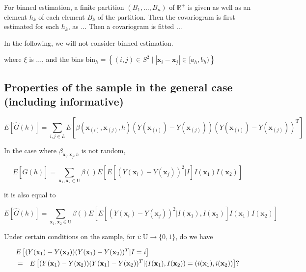\documentclass[12pt]{article}
\theoremstyle{definition}
\theoremstyle{remark}
\newcommand{\paramnuisance}{\xi}
\newcommand{\Sample}{S}
\newcommand{\Pop}{\mathrm{U}}
\newcommand{\position}{\mathbf{x}}
\newcommand{\Sampleindex}{L}
\newcommand{\Signal}{Y}
\begin{document}
For binned estimation, a finite partition $(B_1,\ldots,B_n)$ of $\mathbb{R}^+$ is given as well as an element $h_k$ of each element $B_k$ of the partition. 
Then the covariogram is first estimated for each $h_k$, as 
...
Then a covariogram is fitted 
...

In the following, we will not consider binned estimation.


where {\color{red} $\paramnuisance$ is ..., and the bins $\mathrm{bin}_h=\left\{(i,j)\in\Sample^2\mid \left|\position_i-\position_j\right|\in [a_h,b_h)\right\}$}

\subsection{Properties of the sample in the general case (including informative)}
\begin{equation}
    E[\hat{G}(h)]=\sum_{i,j\in\Sampleindex}E\left[ \beta(\position_{(i)},\position_{(j)},h)(\Signal(\position_{(i)})-\Signal(\position_{(j)}))(\Signal(\position_{(i)})-\Signal(\position_{(j)}))^{\mathrm{T}}\right]
\end{equation}


In the case where $\beta_{\position_i,\position_j,h}$ is not random,

\begin{equation}
    E[\hat{G}(h)]=\sum_{\position_1,\position_2\in \Pop}{\beta()E\left[E\left[(\Signal(\position_{i})-\Signal(\position_{j}))^{2}|I\right]I(\position_1)I(\position_2)\right]}
\end{equation}

it is also equal to 

\begin{equation}
    E[\hat{G}(h)]=\sum_{\position_1,\position_2\in \Pop}{\beta()E\left[E\left[(\Signal(\position_{i})-\Signal(\position_{j}))^{2}|I(\position_1),I(\position_2)\right]I(\position_1)I(\position_2)\right]}
\end{equation}

Under certain conditions on the sample, for $i:\Pop\to\{0,1\}$, do we have 

\begin{eqnarray*}
\lefteqn{E\left[(\Signal(\position_{1})-\Signal(\position_{2}))(\Signal(\position_{1})-\Signal(\position_{2}))^T|I=i\right]}\\
&=&
E\left[(\Signal(\position_{1})-\Signal(\position_{2}))(\Signal(\position_{1})-\Signal(\position_{2}))^T|(I(\position_1),I(\position_2))=(i(\position_1),i(\position_2))\right]?\end{eqnarray*}
\end{document}
